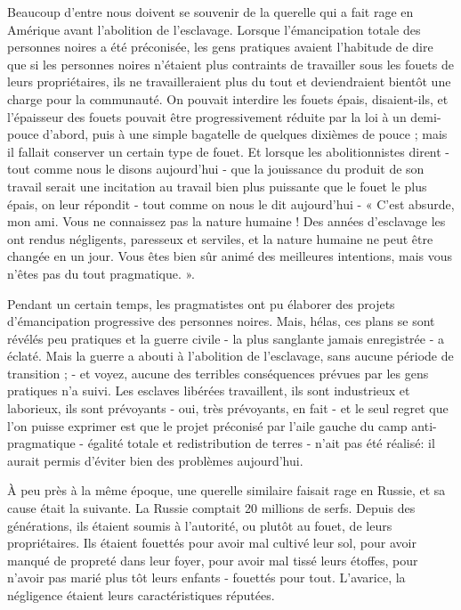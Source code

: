 Beaucoup d'entre nous doivent se souvenir de la querelle qui a fait rage en Amérique avant l'abolition de l'esclavage. Lorsque l'émancipation totale des personnes noires a été préconisée, les gens pratiques avaient l'habitude de dire que si les personnes noires n'étaient plus contraints de travailler sous les fouets de leurs propriétaires, ils ne travailleraient plus du tout et deviendraient bientôt une charge pour la communauté. On pouvait interdire les fouets épais, disaient-ils, et l'épaisseur des fouets pouvait être progressivement réduite par la loi à un demi-pouce d'abord, puis à une simple bagatelle de quelques dixièmes de pouce ; mais il fallait conserver un certain type de fouet. Et lorsque les abolitionnistes dirent - tout comme nous le disons aujourd'hui - que la jouissance du produit de son travail serait une incitation au travail bien plus puissante que le fouet le plus épais, on leur répondit - tout comme on nous le dit aujourd'hui - « C'est absurde, mon ami. Vous ne connaissez pas la nature humaine ! Des années d'esclavage les ont rendus négligents, paresseux et serviles, et la nature humaine ne peut être changée en un jour. Vous êtes bien sûr animé des meilleures intentions, mais vous n'êtes pas du tout pragmatique. ».

Pendant un certain temps, les pragmatistes ont pu élaborer des projets d'émancipation progressive des personnes noires. Mais, hélas, ces plans se sont révélés peu pratiques et la guerre civile - la plus sanglante jamais enregistrée - a éclaté. Mais la guerre a abouti à l'abolition de l'esclavage, sans aucune période de transition ; - et voyez, aucune des terribles conséquences prévues par les gens pratiques n'a suivi. Les esclaves libérées travaillent, ils sont industrieux et laborieux, ils sont prévoyants - oui, très prévoyants, en fait - et le seul regret que l'on puisse exprimer est que le projet préconisé par l'aile gauche du camp anti-pragmatique - égalité totale et redistribution de terres - n'ait pas été réalisé: il aurait permis d'éviter bien des problèmes aujourd'hui.

À peu près à la même époque, une querelle similaire faisait rage en Russie, et sa cause était la suivante. La Russie comptait 20 millions de serfs. Depuis des générations, ils étaient soumis à l'autorité, ou plutôt au fouet, de leurs propriétaires. Ils étaient fouettés pour avoir mal cultivé leur sol, pour avoir manqué de propreté dans leur foyer, pour avoir mal tissé leurs étoffes, pour n'avoir pas marié plus tôt leurs enfants - fouettés pour tout. L'avarice, la négligence étaient leurs caractéristiques réputées.

